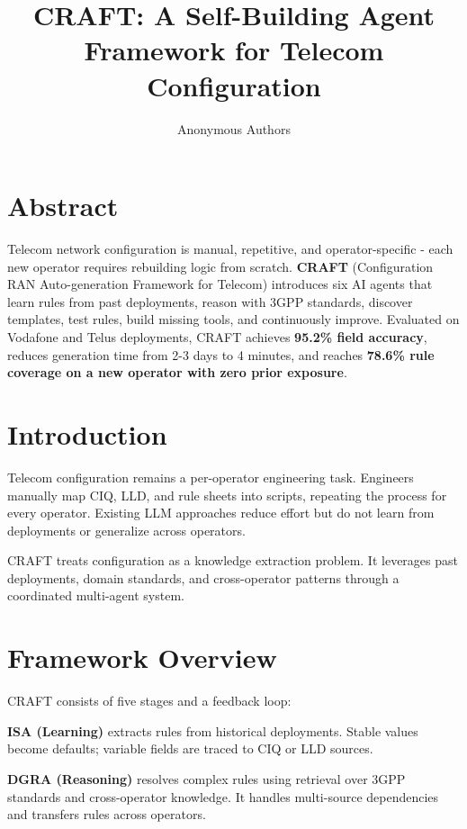 \documentclass[10pt]{article}
\title{\textbf{CRAFT: A Self-Building Agent Framework for Telecom Configuration}}
\author{Anonymous Authors}
\date{}
\begin{document}
\maketitle

\onecolumn
\section*{Abstract}

Telecom network configuration is manual, repetitive, and operator-specific - each new operator requires rebuilding logic from scratch. \textbf{CRAFT} (Configuration RAN Auto-generation Framework for Telecom) introduces six AI agents that learn rules from past deployments, reason with 3GPP standards, discover templates, test rules, build missing tools, and continuously improve. Evaluated on Vodafone and Telus deployments, CRAFT achieves \textbf{95.2\% field accuracy}, reduces generation time from 2-3 days to 4 minutes, and reaches \textbf{78.6\% rule coverage on a new operator with zero prior exposure}.

\twocolumn

\section{Introduction}

Telecom configuration remains a per-operator engineering task. Engineers manually map CIQ, LLD, and rule sheets into scripts, repeating the process for every operator. Existing LLM approaches reduce effort but do not learn from deployments or generalize across operators.

CRAFT treats configuration as a knowledge extraction problem. It leverages past deployments, domain standards, and cross-operator patterns through a coordinated multi-agent system.

\section{Framework Overview}

CRAFT consists of five stages and a feedback loop:

\textbf{ISA (Learning)} extracts rules from historical deployments. Stable values become defaults; variable fields are traced to CIQ or LLD sources.

\textbf{DGRA (Reasoning)} resolves complex rules using retrieval over 3GPP standards and cross-operator knowledge. It handles multi-source dependencies and transfers rules across operators.
\end{document}
